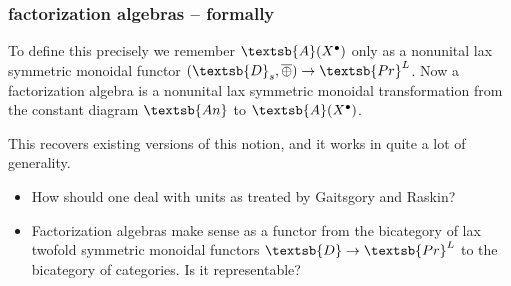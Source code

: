 \documentclass[11pt,xcolor={dvipsnames},hyperref={pdftex,pdfpagemode=UseNone,hidelinks,pdfdisplaydoctitle=true},usepdftitle=false]{beamer}
\renewcommand{\AA}{\textsb{A}}
\newcommand{\DD}{\textsb{D}}
\newcommand{\rightsum}{\mathbin{\overline{\oplus}}}
\begin{document}
\begin{frame}
  \frametitle{factorization algebras -- formally}
  To define this precisely we remember $\AA(X^{\bullet})$ only as a nonunital lax symmetric monoidal functor $(\DD_s,\rightsum) \to \textsb{Pr}^L$.
  Now a factorization algebra is a nonunital lax symmetric monoidal transformation from the constant diagram $\textsb{An}$ to $\AA(X^{\bullet})$.

  This recovers existing versions of this notion, and it works in quite a lot of generality.

  \bigskip

  \begin{itemize}
    \item How should one deal with units as treated by Gaitsgory and Raskin?
    \item Factorization algebras make sense as a functor from the bicategory of lax twofold symmetric monoidal functors $\DD \to \textsb{Pr}^L$ to the bicategory of categories. Is it representable?
  \end{itemize}
\end{frame}
\end{document}
